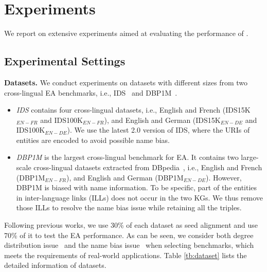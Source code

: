 
\section{Experiments}
\label{sec:exp}

We report on extensive experiments aimed at evaluating the performance of  \ClusterEA{}.


\vspace{-2mm}
\subsection{Experimental Settings}\label{sec:exp_setting}


\noindent
\textbf{Datasets.}
We conduct experiments on datasets with different sizes from two cross-lingual EA benchmarks, i.e., IDS~\cite{OpenEA2020VLDB} and DBP1M~\cite{LargeEA22}. 
\begin{itemize}[topsep=0pt,itemsep=0pt,parsep=0pt,partopsep=0pt,leftmargin=*]
\item 
\emph{IDS} contains four cross-lingual datasets, i.e., English and French (IDS15K$_{EN-FR}$ and IDS100K$_{EN-FR}$), and English and German (IDS15K$_{EN-DE}$ and IDS100K$_{EN-DE}$).  We use the latest 2.0 version of IDS, where the URIs of entities are encoded to avoid possible name bias.
\item \emph{DBP1M} is the largest cross-lingual benchmark for EA. It contains two large-scale cross-lingual datasets extracted from DBpedia~\cite{DBPedia}, i.e., English and French (DBP1M$_{EN-FR}$), and English and German (DBP1M$_{EN-DE}$). 
However, DBP1M is biased with name information. To be specific, part of the entities in inter-language links (ILLs) does not occur in the two KGs. We thus remove those ILLs to resolve the name bias issue while retaining all the triples.
\end{itemize}

Following previous works, we use 30\% of each dataset as seed alignment and use 70\% of it to test the EA performance.
As can be seen, we consider both degree distribution issue~\cite{RSN19, OpenEA2020VLDB} and the name bias issue~\cite{AttrGNN20} when selecting benchmarks, which meets the requirements of real-world applications.
Table \ref{tb:dataset} lists the detailed information of datasets.

